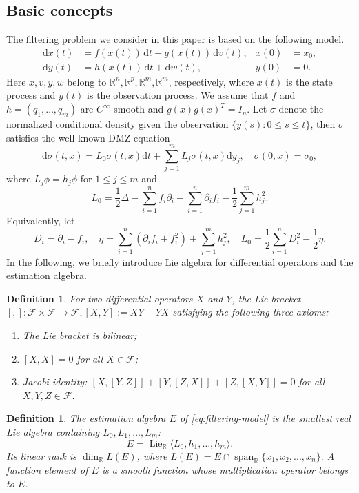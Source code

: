 \documentclass{tCON2e}
\newenvironment{revision}{\begingroup\color{black}}{\endgroup}
\numberwithin{equation}{section}
\theoremstyle{journalplain}
\theoremstyle{journaldef}
\newtheorem{definition}[theorem]{Definition}
\newenvironment{revision}{}{}
\begin{document}
\begin{revision}
\subsection{Basic concepts}
The filtering problem we consider in this paper is based on the following model.
\begin{equation}
\begin{aligned}
\mathrm dx(t)&=f(x(t))\,\mathrm dt+g(x(t))\,\mathrm dv(t),
&x(0)&=x_0,\\
\mathrm dy(t)&=h(x(t))\,\mathrm dt+\mathrm dw(t),
&y(0)&=0.
\end{aligned}
\label{eq:filtering-model}
\end{equation}
Here $x,v,y,w$ belong to $\mathbb R^n, \mathbb R^p, \mathbb R^m, \mathbb R^m$, respectively, where $x(t)$ is the state process and $y(t)$ is the observation process.
We assume that $f$ and $h=(q_1,\ldots,q_m)$ are $C^\infty$ smooth and
$g(x)g(x)^T=I_n$.
Let $\sigma$ denote the
normalized conditional density given the observation $\{y(s): 0 \le s \le t\}$, then $\sigma$ satisfies the well-known DMZ equation
\[
\mathrm d\sigma(t,x)=L_0\sigma(t,x)\mathrm dt+
\sum_{j=1}^m L_j\sigma(t,x)\mathrm dy_j, \quad \sigma(0,x) = \sigma_0,
\]
where $L_j\phi=h_j\phi$ for $1\le j\le m$ and
\[
L_0=\frac12\Delta-\sum_{i=1}^n f_i\partial_i
-\sum_{i=1}^n\partial_i f_i-\frac12\sum_{j=1}^m h_j^2.
\]
Equivalently, let
\begin{equation}
D_i=\partial_i-f_i,\quad
\eta=\sum_{i=1}^n\!\left(\partial_i f_i+f_i^2\right)+\sum_{j=1}^m h_j^2,\quad
L_0=\frac12\sum_{i=1}^n D_i^2-\frac12\eta.
\label{eq:D-eta-L0}
\end{equation}
In the following, we briefly introduce Lie algebra for differential operators and the estimation algebra.
\begin{definition}
 For two differential operators $X$ and $Y$, the Lie bracket $[,]:\mathcal F \times \mathcal F \to \mathcal F, [X,Y]:=XY-YX$ satisfying the following three axioms:
 \begin{enumerate}
     \item The Lie bracket is bilinear;
     \item $[X,X] = 0$ for all $X \in \mathcal F$;
     \item Jacobi identity: $[X,[Y,Z]] + [Y,[Z,X]] + [Z,[X,Y]] = 0$ for all $X,Y,Z \in \mathcal F$.
 \end{enumerate}
\end{definition}
\begin{definition}
The estimation algebra $E$ of \eqref{eq:filtering-model} is the smallest
real Lie algebra containing $L_0,L_1,\ldots,L_m$:
\begin{equation}
E=\operatorname{Lie}_{\mathbb R}\langle L_0,h_1,\ldots,h_m\rangle.
\label{eq:estimation-algebra}
\end{equation}
Its linear rank is $\dim_{\mathbb R}L(E)$, where
\(
L(E)=E\cap\operatorname{span}_{\mathbb R}\{x_1,x_2,...,x_n\}.
\)
A function element of $E$ is a smooth function whose multiplication
operator belongs to $E$.
\end{definition}


\end{revision}
\end{document}
